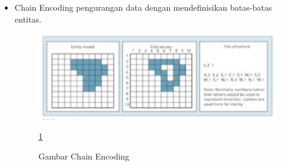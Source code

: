 \begin{itemize}
		\item  Chain Encoding
				pengurangan data dengan mendefinisikan batas-batas entitas.
				\begin{figure} [ht]
					\centerline{\includegraphics[width=1\textwidth]{figures/chainencoding.JPG}}
					\caption{Gambar Chain Encoding}
					\label{chainencoding}
					\ref{chainencoding}
				\end{figure}


\end{itemize}
